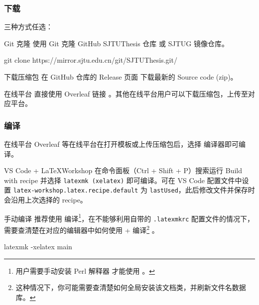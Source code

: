 \begin{frame}

  \frametitle{下载}

  三种方式任选：

  \medskip

  \alert{Git 克隆} 使用 Git 克隆 GitHub SJTUThesis 仓库  或 SJTUG 镜像仓库。

  \begin{exampleblock}{\faGit*}

    \ttfamily\small

    git clone https://mirror.sjtu.edu.cn/git/SJTUThesis.git/

  \end{exampleblock}

  \alert{下载压缩包} 在 GitHub 仓库的 Release 页面  下载最新的 Source code (zip)。

  \medskip

  \alert{在线平台} 直接使用 Overleaf 链接 。其他在线平台用户可以下载压缩包，上传至对应平台。

\end{frame}

\begin{frame}

  \frametitle{编译}

  \alert{在线平台} Overleaf 等在线平台在打开模板或上传压缩包后，选择  编译器即可编译。

  \medskip

  \alert{VS Code + \LaTeX Workshop} 在命令面板（Ctrl + Shift + P）搜索运行 Build with recipe 并选择 \texttt{latexmk (xelatex)} 即可编译。可在 VS Code 配置文件中设置 \texttt{latex-workshop.latex.recipe.default} 为 \texttt{lastUsed}，此后修改文件并保存时会沿用上次选择的 recipe。

  \medskip

  \alert{手动编译} 推荐使用  编译\footnote{ 用户需要手动安装 Perl 解释器  才能使用 。}，在不能够利用自带的 \texttt{.latexmkrc} 配置文件的情况下，需要查清楚在对应的编辑器中如何使用  +  编译\footnote{这种情况下，你可能需要查清楚如何全局安装该文档类，并刷新文件名数据库。} 。

  \begin{exampleblock}{\faTerminal}

    \ttfamily\small

    latexmk -xelatex main

  \end{exampleblock}

\end{frame}

